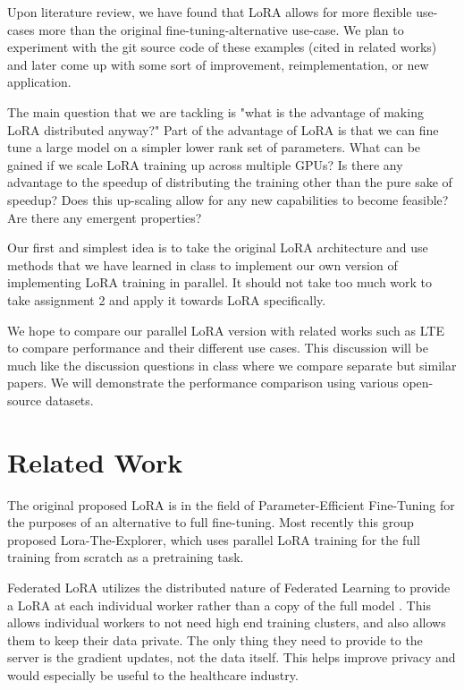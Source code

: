 \documentclass[pdftex,twocolumn,10pt,letterpaper]{article}
\begin{document}
Upon literature review, we have found that LoRA allows for more flexible use-cases more than the original fine-tuning-alternative use-case. We plan to experiment with the git source code of these examples (cited in related works) and later come up with some sort of improvement, reimplementation, or new application.

The main question that we are tackling is "what is the advantage of making LoRA distributed anyway?" Part of the advantage of LoRA is that we can fine tune a large model on a simpler lower rank set of parameters. What can be gained if we scale LoRA training up across multiple GPUs? Is there any advantage to the speedup of distributing the training other than the pure sake of speedup? Does this up-scaling allow for any new capabilities to become feasible? Are there any emergent properties?

Our first and simplest idea is to take the original LoRA architecture and use methods that we have learned in class to implement our own version of implementing LoRA training in parallel. It should not take too much work to take assignment 2 and apply it towards LoRA specifically.

We hope to compare our parallel LoRA version with related works such as LTE to compare performance and their different use cases. This discussion will be much like the discussion questions in class where we compare separate but similar papers. We will demonstrate the performance comparison using various open-source datasets. 
 
\section{Related Work}
The original proposed LoRA \cite{Hu2021LoRA} is in the field of Parameter-Efficient Fine-Tuning for the purposes of an alternative to full fine-tuning. Most recently this group proposed Lora-The-Explorer, which uses parallel LoRA training for the full training from scratch as a pretraining task. \cite{huh2024training}

Federated LoRA utilizes the distributed nature of Federated Learning to provide a LoRA at each individual worker rather than a copy of the full model \cite{yi2023fedlora} \cite{Rieke2019FederatedLearning}. This allows individual workers to not need high end training clusters, and also allows them to keep their data private. The only thing they need to provide to the server is the gradient updates, not the data itself. This helps improve privacy and would especially be useful to the healthcare industry.
\end{document}
